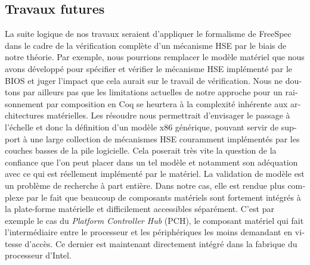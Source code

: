 \begin{otherlanguage}{french}
  \subsection*{Travaux futures}
  La suite logique de nos travaux seraient d’appliquer le formalisme de FreeSpec
  dans le cadre de la vérification complète d’un mécanisme HSE par le biais de notre
  théorie.
  Par exemple, nous pourrions remplacer le modèle matériel que nous avons
  développé pour spécifier et vérifier le mécanisme HSE implémenté par le BIOS
  et juger l’impact que cela aurait sur le travail de vérification.
  Nous ne doutons par ailleurs pas que les limitations actuelles de notre
  approche pour un raisonnement par composition en Coq se heurtera à la
  complexité inhérente aux architectures matérielles. 
  Les résoudre nous permettrait d’envisager le passage à l’échelle et donc la
  définition d’un modèle x86 générique, pouvant servir de support à une large
  collection de mécanismes HSE couramment implémentés par les couches basses de
  la pile logicielle.
  Cela poserait très vite la question de la confiance que l’on peut placer dans
  un tel modèle et notamment son adéquation avec ce qui est réellement
  implémenté par le matériel.
  La validation de modèle est un problème de recherche à part entière.
  Dans notre cas, elle est rendue plus complexe par le fait que beaucoup de
  composants matériels sont fortement intégrés à la plate-forme matérielle et difficilement accessibles séparément. 
  C'est par exemple le cas du \emph{Platform
    Controller Hub} (PCH), le composant matériel qui fait l’intermédiaire entre
  le processeur et les périphériques les moins demandant en vitesse d’accès.
  Ce dernier est maintenant directement intégré dans la fabrique du processeur d’Intel. 
\end{otherlanguage}
